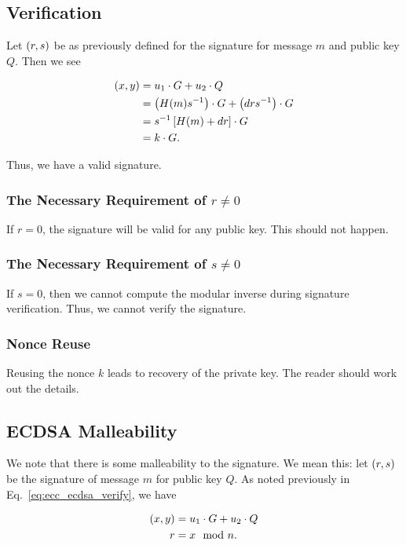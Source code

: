 \subsection{Verification}

Let $\left( r,s \right)$ be as previously defined for the signature
for message $m$ and public key $Q$.
Then we see

\begin{align}
    \left( x,y \right) &= u_{1}\cdot G + u_{2}\cdot Q
            \nonumber\\
        &= \left( H(m)s^{-1} \right)\cdot G + \left( drs^{-1} \right)\cdot G
            \nonumber\\
        &= s^{-1}\left[ H(m) + dr \right]\cdot G
            \nonumber\\
        &= k\cdot G.
    \label{eq:ecc_ecdsa_verify}
\end{align}

\noindent
Thus, we have a valid signature.

\subsubsection{The Necessary Requirement of $r\ne0$}
If $r = 0$, the signature will be valid for any public key.
This should not happen.

\subsubsection{The Necessary Requirement of $s\ne0$}
If $s = 0$, then we cannot compute the modular inverse during
signature verification.
Thus, we cannot verify the signature.

\subsubsection{Nonce Reuse}
Reusing the \gls{nonce} $k$ leads to recovery of the private key.
The reader should work out the details.

\subsection{ECDSA Malleability}
\label{ssec:ecdsa_malleability}

We note that there is some malleability to the signature.
We mean this:
let $\left( r,s \right)$ be the signature of message $m$ for public key $Q$.
As noted previously in Eq.~\eqref{eq:ecc_ecdsa_verify},
we have

\begin{align}
    \left( x,y \right) &= u_{1}\cdot G + u_{2}\cdot Q \nonumber\\
    r &= x \mod n.
\end{align}


